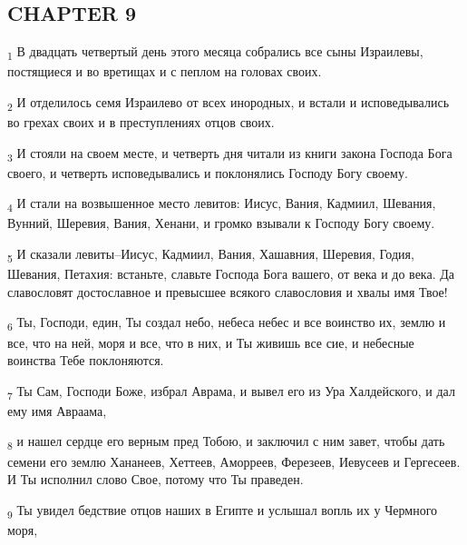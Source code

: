 \subsection{CHAPTER 9}
\begin{tcolorbox}
\textsubscript{1} В двадцать четвертый день этого месяца собрались все сыны Израилевы, постящиеся и во вретищах и с пеплом на головах своих.
\end{tcolorbox}
\begin{tcolorbox}
\textsubscript{2} И отделилось семя Израилево от всех инородных, и встали и исповедывались во грехах своих и в преступлениях отцов своих.
\end{tcolorbox}
\begin{tcolorbox}
\textsubscript{3} И стояли на своем месте, и четверть дня читали из книги закона Господа Бога своего, и четверть исповедывались и поклонялись Господу Богу своему.
\end{tcolorbox}
\begin{tcolorbox}
\textsubscript{4} И стали на возвышенное место левитов: Иисус, Вания, Кадмиил, Шевания, Вунний, Шеревия, Вания, Хенани, и громко взывали к Господу Богу своему.
\end{tcolorbox}
\begin{tcolorbox}
\textsubscript{5} И сказали левиты--Иисус, Кадмиил, Вания, Хашавния, Шеревия, Годия, Шевания, Петахия: встаньте, славьте Господа Бога вашего, от века и до века. Да славословят достославное и превысшее всякого славословия и хвалы имя Твое!
\end{tcolorbox}
\begin{tcolorbox}
\textsubscript{6} Ты, Господи, един, Ты создал небо, небеса небес и все воинство их, землю и все, что на ней, моря и все, что в них, и Ты живишь все сие, и небесные воинства Тебе поклоняются.
\end{tcolorbox}
\begin{tcolorbox}
\textsubscript{7} Ты Сам, Господи Боже, избрал Аврама, и вывел его из Ура Халдейского, и дал ему имя Авраама,
\end{tcolorbox}
\begin{tcolorbox}
\textsubscript{8} и нашел сердце его верным пред Тобою, и заключил с ним завет, чтобы дать семени его землю Хананеев, Хеттеев, Аморреев, Ферезеев, Иевусеев и Гергесеев. И Ты исполнил слово Свое, потому что Ты праведен.
\end{tcolorbox}
\begin{tcolorbox}
\textsubscript{9} Ты увидел бедствие отцов наших в Египте и услышал вопль их у Чермного моря,
\end{tcolorbox}
